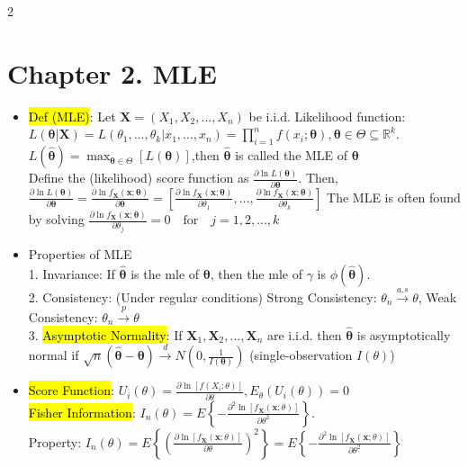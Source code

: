 \documentclass[a4paper,10pt]{article}
\begin{document}
\begin{multicols}{2}
\begin{itemize}
    
\end{itemize}

\section*{Chapter 2. MLE}
\begin{itemize}
    \item \hl{Def (MLE)}: Let $\bm{X} = (X_1, X_2, \dots, X_n)$ be i.i.d.
    Likelihood function: $L(\bm{\theta} | \bm{X}) = L(\theta_1, \dots, \theta_k | x_1, \dots, x_n) = \prod_{i=1}^{n} f(x_i; \bm{\theta}), \bm{\theta} \in \Theta \subseteq \mathbb{R}^k.$\\ 
    $L(\hat{\bm{\theta}}) = \max_{\bm{\theta} \in \Theta} [L(\bm{\theta})]$,then $\hat{\bm{\theta}}$ is called the MLE of $\bm{\theta}$\\
    Define the (likelihood) score function as $\frac{\partial \ln L(\bm{\theta})}{\partial \bm{\theta}}$. Then, 
    $\frac{\partial \ln L(\bm{\theta})}{\partial \bm{\theta}} = \frac{\partial \ln f_{\bm{X}}(\bm{x}; \bm{\theta})}{\partial \bm{\theta}} = \left[ \frac{\partial \ln f_{\bm{X}}(\bm{x}; \bm{\theta})}{\partial \theta_1}, \dots, \frac{\partial \ln f_{\bm{X}}(\bm{x}; \bm{\theta})}{\partial \theta_k} \right]$
    The MLE is often found by solving
    $\frac{\partial \ln f_{\bm{X}}(\bm{x}; \bm{\theta})}{\partial \theta_j} = 0 \quad \text{for} \quad j = 1, 2, \dots, k$
    \item Properties of MLE\\
    1. Invariance: If $\hat{\bm{\theta}}$ is the mle of $\bm{\theta}$, then the mle of $\gamma$ is $\phi(\hat{\bm{\theta}})$.\\
    2. Consistency: (Under regular conditions) Strong Consistency: $\theta_n \xrightarrow{a.s} \theta$, Weak Consistency: $\theta_n \xrightarrow{p} \theta$\\
    3. \hl{Asymptotic Normality}: If $\bm{X}_1, \bm{X}_2, \dots, \bm{X}_n$ are i.i.d. then $\hat{\bm{\theta}}$ is asymptotically normal if 
    $
    \sqrt{n} (\hat{\bm{\theta}} - \bm{\theta}) \xrightarrow{d} N\left( 0, \frac{1}{I(\bm{\theta})} \right)
    $ (single-observation $I(\theta)$)

    \item \hl{Score Function}: $U_i(\theta) = \frac{\partial \ln [f(X_i; \theta)]}{\partial \theta}, E_{\theta} (U_i(\theta)) = 0$\\
    \hl{Fisher Information}: $I_n(\theta) = E \left\{ -\frac{\partial^2 \ln \left[ f_{\bm{X}}(\bm{x}; \theta) \right]}{\partial \theta^2} \right\}.$\\
    Property:
    $I_n(\theta) = E \left\{ \left( \frac{\partial \ln \left[ f_{\bm{X}}(\bm{x}; \theta) \right]}{\partial \theta} \right)^2 \right\} = E \left\{ -\frac{\partial^2 \ln \left[ f_{\bm{X}}(\bm{x}; \theta) \right]}{\partial \theta^2} \right\}$


\end{itemize}
\end{multicols}
\end{document}
